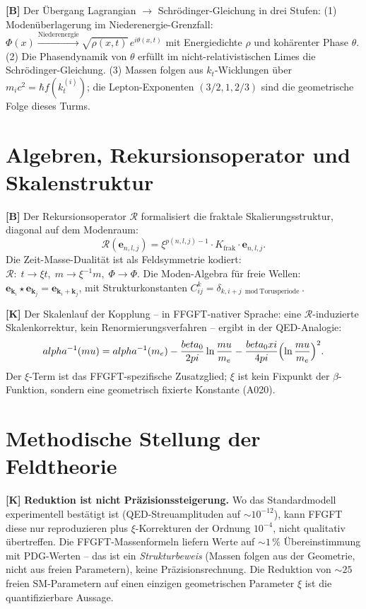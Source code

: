 \textbf{[B]} Der Übergang Lagrangian $\to$ Schrödinger-Gleichung in drei Stufen:
(1) Modenüberlagerung im Niederenergie-Grenzfall:
$\Phi(x)\xrightarrow{\text{Niederenergie}}\sqrt{\rho(x,t)}\,e^{i\theta(x,t)}$
mit Energiedichte $\rho$ und kohärenter Phase $\theta$. (2) Die Phasendynamik
von $\theta$ erfüllt im nicht-relativistischen Limes die Schrödinger-Gleichung.
(3) Massen folgen aus $k_t$-Wicklungen über $m_ic^2=\hbar f(k_t^{(i)})$; die
Lepton-Exponenten $(3/2,1,2/3)$ sind die geometrische Folge dieses Turms.

\section{Algebren, Rekursionsoperator und Skalenstruktur}

\textbf{[B]} Der Rekursionsoperator $\mathcal R$ formalisiert die fraktale
Skalierungsstruktur, diagonal auf dem Modenraum:
\[
  \mathcal R(\mathbf e_{n,l,j}) = \xi^{p(n,l,j)-1}\cdot K_\text{frak}\cdot\mathbf e_{n,l,j}.
\]
Die Zeit-Masse-Dualität ist als Feldsymmetrie kodiert:
$\mathcal R:\;t\to\xi t,\;m\to\xi^{-1}m,\;\Phi\to\Phi$. Die Moden-Algebra
für freie Wellen: $\mathbf e_{\mathbf k_i}\star\mathbf e_{\mathbf k_j}
=\mathbf e_{\mathbf k_i+\mathbf k_j}$, mit Strukturkonstanten
$C_{ij}^k=\delta_{k,i+j\bmod\text{Torusperiode}}$.

\textbf{[K]} Der Skalenlauf der Kopplung -- in FFGFT-nativer Sprache: eine
$\mathcal R$-induzierte Skalenkorrektur, kein Renormierungsverfahren -- ergibt
in der QED-Analogie:
\[
  \alpha^{-1}(\mu) = \alpha^{-1}(m_e)
  - \frac{\beta_0}{2\pi}\ln\frac\mu{m_e}
  - \frac{\beta_0\xi}{4\pi}\Bigl(\ln\frac\mu{m_e}\Bigr)^2.
\]
Der $\xi$-Term ist das FFGFT-spezifische Zusatzglied; $\xi$ ist kein Fixpunkt
der $\beta$-Funktion, sondern eine geometrisch fixierte Konstante (A020).

\section{Methodische Stellung der Feldtheorie}

\textbf{[K]} \textbf{Reduktion ist nicht Präzisionssteigerung.} Wo das
Standardmodell experimentell bestätigt ist (QED-Streuamplituden auf
$\sim10^{-12}$), kann FFGFT diese nur reproduzieren plus $\xi$-Korrekturen der
Ordnung $10^{-4}$, nicht qualitativ übertreffen. Die FFGFT-Massenformeln
liefern Werte auf $\sim1\,\%$ Übereinstimmung mit PDG-Werten -- das ist ein
\emph{Strukturbeweis} (Massen folgen aus der Geometrie, nicht aus freien
Parametern), keine Präzisionsrechnung. Die Reduktion von $\sim25$ freien
SM-Parametern auf einen einzigen geometrischen Parameter $\xi$ ist die
quantifizierbare Aussage.

